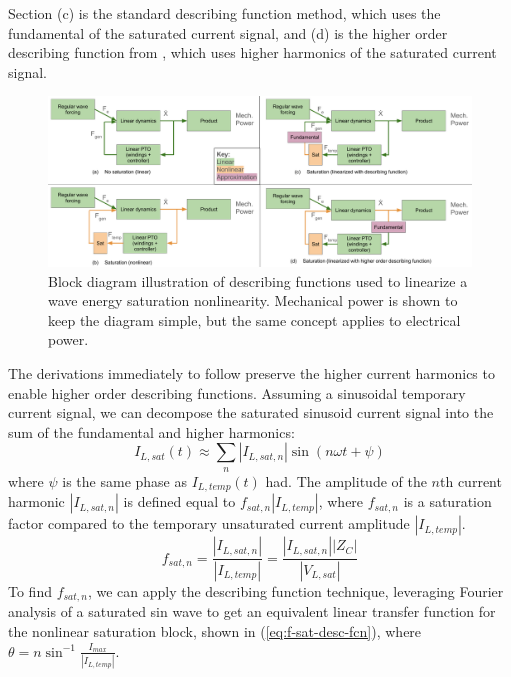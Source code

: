 \documentclass{ifacconf}
\begin{document}
Section (c) is the standard describing function method, which uses the fundamental of the saturated current signal, and (d) is the higher order describing function from \cite{nuij_higher-order_2006}, which uses higher harmonics of the saturated current signal.
\begin{figure}
    \centering
    \includegraphics[width=18.2cm]{ifacconf_latex/figs/IFAC CAMS describing function block diagram.pdf}
    \caption{Block diagram illustration of describing functions used to linearize a wave energy saturation nonlinearity. Mechanical power is shown to keep the diagram simple, but the same concept applies to electrical power.}
    \label{fig:block-diagram-nonlinear}
\end{figure}
The derivations immediately to follow preserve the higher current harmonics to enable higher order describing functions. %
 Assuming a sinusoidal temporary current signal, we can decompose the saturated sinusoid current signal into the sum of the fundamental and higher harmonics: 
\begin{equation}
    I_{L,sat}(t) \approx \sum_n |I_{L,sat,n}| \sin(n \omega t + \psi)
\end{equation} where $\psi$ is the same phase as $I_{L,temp}(t)$ had. The amplitude of the $n$th current harmonic $|I_{L,sat,n}|$ is defined equal to $f_{sat,n} |I_{L,temp}|$, where $f_{sat,n}$ is a saturation factor compared to the temporary unsaturated current amplitude $|I_{L,temp}|$.
\begin{equation}\label{f-sat-i-defn}
    f_{sat,n} = \frac{|I_{L,sat,n}|}{|I_{L,temp}|} = \frac{|I_{L,sat,n}||Z_C|}{|V_{L,sat}|}
\end{equation}
To find $f_{sat,n}$, we can apply the describing function technique, leveraging Fourier analysis of a saturated sin wave to get an equivalent linear transfer function for the nonlinear saturation block, shown in (\ref{eq:f-sat-desc-fcn}), where $\theta = n \sin^{-1}\frac{I_{max}}{|I_{L,temp}|} $.
\end{document}
